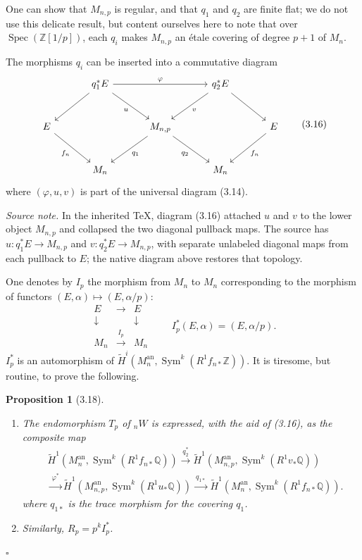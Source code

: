 \documentclass[10pt]{article}
\newcommand{\Q}{\mathbb Q}
\newcommand{\Z}{\mathbb Z}
\newcommand{\Sym}{\operatorname{Sym}}
\newcommand{\Spec}{\operatorname{Spec}}
\newcommand{\an}{\mathrm{an}}
\newcommand{\QED}{\hfill$\square$}
\newtheorem*{proposition}{Proposition}
\begin{document}
One can show that $M_{n,p}$ is regular, and that $q_1$ and $q_2$ are finite flat; we do not use this delicate result, but content ourselves here to note that over $\Spec(\Z[1/p])$, each $q_i$ makes $M_{n,p}$ an étale covering of degree $p+1$ of $M_n$.

The morphisms $q_i$ can be inserted into a commutative diagram
\begin{equation}
\begin{tikzcd}[column sep=3.3em,row sep=2.7em]
& q_1^*E \arrow[rr,"\varphi"] \arrow[dl] \arrow[dr,"u"'] &&
q_2^*E \arrow[dl,"v"] \arrow[dr] & \\
E \arrow[dr,"f_n"'] && M_{n,p} \arrow[dl,"q_1"] \arrow[dr,"q_2"'] &&
E \arrow[dl,"f_n"] \\
& M_n && M_n &
\end{tikzcd}
\tag{3.16}
\end{equation}
where $(\varphi,u,v)$ is part of the universal diagram (3.14).

\noindent\emph{Source note.} In the inherited TeX, diagram (3.16) attached $u$ and $v$ to the lower object $M_{n,p}$ and collapsed the two diagonal pullback maps. The source has $u:q_1^*E\to M_{n,p}$ and $v:q_2^*E\to M_{n,p}$, with separate unlabeled diagonal maps from each pullback to $E$; the native diagram above restores that topology.

One denotes by $I_p$ the morphism from $M_n$ to $M_n$ corresponding to the morphism of functors $(E,\alpha)\mapsto (E,\alpha/p)$:
\[
\begin{array}{ccc}
E&\longrightarrow&E\\
\downarrow&&\downarrow\\
M_n&\xrightarrow{\ I_p\ }&M_n
\end{array}
\qquad
I_p^*(E,\alpha)=(E,\alpha/p).
\tag{3.17}
\]
$I_p^*$ is an automorphism of $\widetilde H^i(M_n^{\an},\Sym^k(R^1f_{n*}\Z))$. It is tiresome, but routine, to prove the following.

\begin{proposition}[3.18]
\leavevmode
\begin{enumerate}[label=(\roman*)]
\item The endomorphism $T_p$ of ${}_nW$ is expressed, with the aid of (3.16), as the composite map
\[
\begin{aligned}
&\widetilde H^1(M_n^{\an},\Sym^k(R^1f_{n*}\Q))
\xrightarrow{\ q_2^*\ }
\widetilde H^1(M_{n,p}^{\an},\Sym^k(R^1v_*\Q))\\
&\xrightarrow{\ \varphi^*\ }
\widetilde H^1(M_{n,p}^{\an},\Sym^k(R^1u_*\Q))
\xrightarrow{\ q_{1*}\ }
\widetilde H^1(M_n^{\an},\Sym^k(R^1f_{n*}\Q)).
\end{aligned}
\]
where $q_{1*}$ is the trace morphism for the covering $q_1$.
\item Similarly, $R_p=p^k I_p^*$.
\end{enumerate}
\end{proposition}
\QED
\end{document}
